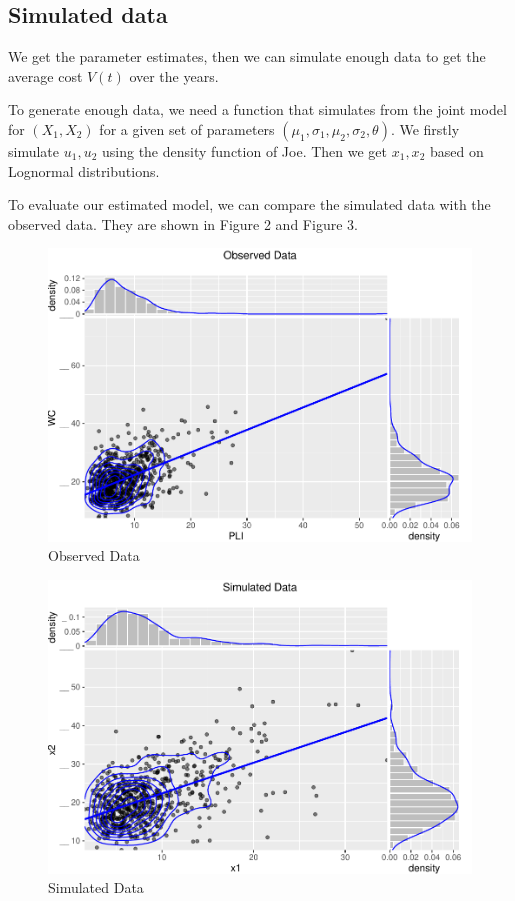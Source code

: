 \documentclass[11pt,]{article}
\begin{document}
\hypertarget{simulated-data}{%
\subsection{Simulated data}\label{simulated-data}}

We get the parameter estimates, then we can simulate enough data to get
the average cost \(V(t)\) over the years.

To generate enough data, we need a function that simulates from the
joint model for \((X_1,X_2)\) for a given set of parameters
\((\mu_{1}, \sigma_{1},\mu_{2},\sigma_{2},\theta)\). We firstly simulate
\(u_1, u_2\) using the density function of Joe. Then we get \(x_1, x_2\)
based on Lognormal distributions.

To evaluate our estimated model, we can compare the simulated data with
the observed data. They are shown in Figure 2 and Figure 3.

\begin{figure}
\centering
\includegraphics{figs/unnamed-chunk-6.pdf}
\caption{Observed Data}
\end{figure}

\begin{figure}
\centering
\includegraphics{figs/unnamed-chunk-7.pdf}
\caption{Simulated Data}
\end{figure}
\end{document}
